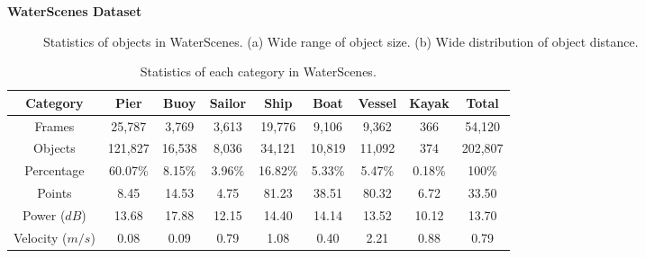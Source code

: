\documentclass[final]{beamer}
\newlength{\sepwidthB}
\newlength{\colwidthB}
\newcommand{\separatorcolumnB}{\begin{column}{\sepwidthB}\end{column}}
\begin{document}
\begin{frame}[t]
\begin{columns}
\begin{column}[T]{\colwidthB}
\begin{block}{\Large{\textbf{WaterScenes Dataset}}}
\begin{figure}[h]
\centering
{}
\quad
\hspace{-6mm}
\caption{Statistics of objects in WaterScenes. (a) Wide range of object size. (b) Wide distribution of object distance.}
\label{fig:statistics}
\end{figure}

\vspace{-0.2cm}

\begin{table}[!h]
\caption{Statistics of each category in WaterScenes.}
\vspace{-0.8cm}
\normalsize
\setlength\tabcolsep{9pt}
\begin{tabular}{c|cccccccc}
\toprule
\bf{Category} & \bf{Pier} & \bf{Buoy} & \bf{Sailor} & \bf{Ship} & \bf{Boat} & \bf{Vessel} & \bf{Kayak} & \bf{Total} \\\midrule
Frames & 25,787 & 3,769 & 3,613 & 19,776 & 9,106 & 9,362 & 366 & 54,120 \\
Objects & 121,827 & 16,538 & 8,036 & 34,121 & 10,819 & 11,092 & 374 & 202,807 \\
Percentage & 60.07\% & 8.15\% & 3.96\% & 16.82\% & 5.33\% & 5.47\% & 0.18\% & 100\% \\\midrule
Points & 8.45 & 14.53 & 4.75 & 81.23 & 38.51 & 80.32 & 6.72 & 33.50\\
Power ($dB$)& 13.68 & 17.88 & 12.15 & 14.40 & 14.14 & 13.52 & 10.12 & 13.70 \\
Velocity ($m/s$) & 0.08 & 0.09 & 0.79 & 1.08 & 0.40 & 2.21 & 0.88 & 0.79\\
\bottomrule
\end{tabular}
\end{table}
\end{block}
\end{column}
\separatorcolumnB
\begin{column}[T]{\colwidthB}


\end{column}
\end{columns}
\end{frame}
\end{document}
